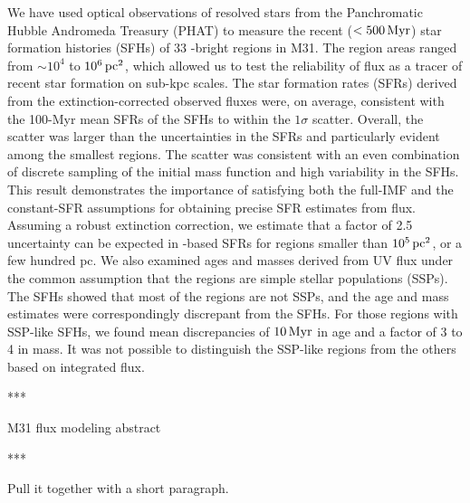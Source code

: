 We have used optical observations of resolved stars from the Panchromatic
Hubble Andromeda Treasury (PHAT) to measure the recent ($< 500\,\mathrm{Myr}$) star
formation histories (SFHs) of 33 \fuv{}-bright regions in M31. The region areas
ranged from $\sim 10^4$ to $10^6\,\mathrm{pc}^2$, which allowed us to test the
reliability of \fuv{} flux as a tracer of recent star formation on sub-kpc
scales. The star formation rates (SFRs) derived from the extinction-corrected
observed \fuv{} fluxes were, on average, consistent with the 100-Myr mean SFRs
of the SFHs to within the $1\sigma$ scatter. Overall, the scatter was larger
than the uncertainties in the SFRs and particularly evident among the smallest
regions. The scatter was consistent with an even combination of discrete
sampling of the initial mass function and high variability in the SFHs. This
result demonstrates the importance of satisfying both the full-IMF and the
constant-SFR assumptions for obtaining precise SFR estimates from \fuv{} flux.
Assuming a robust \fuv{} extinction correction, we estimate that a factor of
2.5 uncertainty can be expected in \fuv{}-based SFRs for regions smaller than
$10^5\,\mathrm{pc}^2$, or a few hundred pc. We also examined ages and masses derived from
UV flux under the common assumption that the regions are simple stellar
populations (SSPs). The SFHs showed that most of the regions are not SSPs, and
the age and mass estimates were correspondingly discrepant from the SFHs. For
those regions with SSP-like SFHs, we found mean discrepancies of $10\,\mathrm{Myr}$ in
age and a factor of 3 to 4 in mass. It was not possible to distinguish the
SSP-like regions from the others based on integrated \fuv{} flux.

***

M31 flux modeling abstract

***

Pull it together with a short paragraph.
